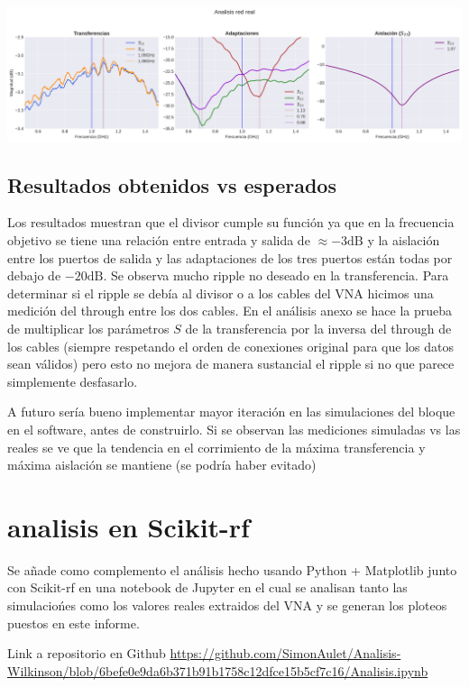 \documentclass[a4paper, 12pt]{article}
\begin{document}
\includegraphics[width=1\linewidth]{./img/plot-real.png}

\subsection*{Resultados obtenidos vs esperados}
Los resultados muestran que el divisor cumple su función ya que en la frecuencia objetivo se tiene una relación entre entrada y salida de $\approx -3\text{dB}$ y la aislación entre los puertos de salida y las adaptaciones de los tres puertos están todas por debajo de $-20\text{dB}$. Se observa mucho ripple no deseado en la transferencia. Para determinar si el ripple se debía al divisor o a los cables del VNA hicimos una medición del through entre los dos cables. En el análisis anexo se hace la prueba de multiplicar los parámetros $S$ de la transferencia por la inversa del through de los cables (siempre respetando el orden de conexiones original para que los datos sean válidos) pero esto no mejora de manera sustancial el ripple si no que parece simplemente desfasarlo.

A futuro sería bueno implementar mayor iteración en las simulaciones del bloque en el software, antes de construirlo. Si se observan las mediciones simuladas vs las reales se ve que la tendencia en el corrimiento de la máxima transferencia y máxima aislación se mantiene (se podría haber evitado)

\section*{analisis en Scikit-rf}
Se añade como complemento el análisis hecho usando Python + Matplotlib junto con Scikit-rf en una notebook de Jupyter en el cual se analisan tanto las simulaciońes como los valores reales extraidos del VNA y se generan los ploteos puestos en este informe.

Link a repositorio en Github \url{https://github.com/SimonAulet/Analisis-Wilkinson/blob/6befe0e9da6b371b91b1758c12dfce15b5cf7c16/Analisis.ipynb}
\end{document}
